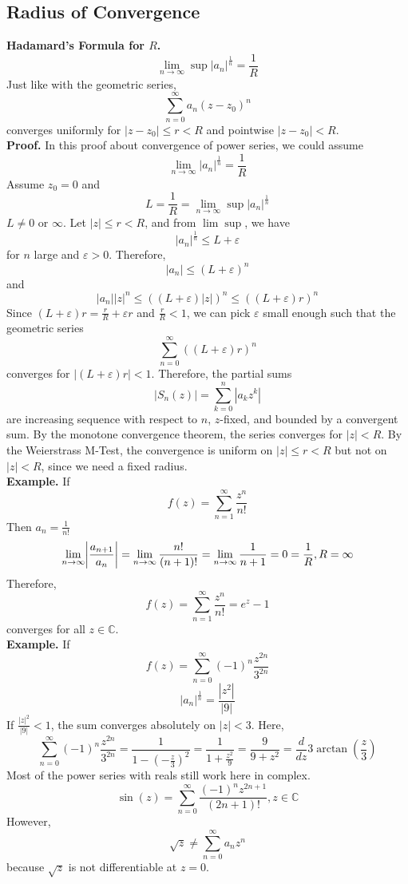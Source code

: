 \documentclass[11pt]{article}
\DeclarePairedDelimiter\abs{\lvert}{\rvert}
\begin{document}
\subsection{Radius of Convergence}
\textbf{Hadamard's Formula for $R$.} 
$$\lim_{n\to \infty} \sup|a_n|^{\frac{1}{n}} = \frac{1}{R}$$
Just like with the geometric series, 
$$ \sum_{n = 0}^{\infty} a_n(z - z_0)^n $$
converges uniformly for $|z - z_0| \leqslant r < R$ and pointwise $|z - z_0| < R$. \\
\textbf{Proof.} In this proof about convergence of power series, we could assume 
$$\lim_{n \to \infty} |a_n|^{\frac{1}{n}} = \frac{1}{R}$$
Assume $z_0 = 0$ and 
$$ L = \frac{1}{R} = \lim_{n \to \infty} \sup |a_n|^{\frac{1}{n}}$$
$L \neq 0$ or $\infty$. Let $|z| \leqslant r < R$, and from $\lim \sup$, we have 
$$|a_n|^{\frac{1}{n}} \leqslant L + \varepsilon $$
for $n$ large and $\varepsilon > 0$. 
Therefore, 
$$ |a_n| \leqslant (L + \varepsilon)^n $$
and 
$$ |a_n||z|^n \leqslant ((L + \varepsilon)|z|)^n \leqslant ((L + \varepsilon)r)^n $$
Since $(L + \varepsilon)r = \frac{r}{R} + \varepsilon r$ and $\frac{r}{R} < 1$, we can pick $\varepsilon$ small enough such that the geometric series 
$$ \sum_{n = 0}^{\infty} ((L + \varepsilon)r)^n$$
converges for $|(L + \varepsilon)r| < 1$. Therefore, the partial sums 
$$ |S_n(z)| = \sum_{k = 0}^n |a_kz^k|$$
are increasing sequence with respect to $n$, $z$-fixed, and bounded by a convergent sum. By the monotone convergence theorem, the series converges for $|z| < R$. By the Weierstrass M-Test, the convergence is uniform on $|z| \leqslant r < R$ but not on $|z| < R$, since we need a fixed radius. \\
\newline
\textbf{Example.} If 
$$f(z) = \sum_{n = 1}^{\infty} \frac{z^n}{n!} $$
Then $a_n = \frac{1}{n!}$
$$ \lim_{n \to \infty} \abs*{\frac{a_{n + 1}}{a_n}} = \lim_{n \to \infty} \frac{n!}{(n+1)!} = \lim_{n \to \infty} \frac{1}{n + 1} = 0 = \frac{1}{R}, R = \infty$$
Therefore, 
$$ f(z) = \sum_{n = 1}^{\infty} \frac{z^n}{n!} = e^z - 1$$
converges for all $z \in \mathbb{C}$. \\
\newpage
\textbf{Example.} If 
$$ f(z) = \sum_{n = 0}^{\infty} (-1)^n \frac{z^{2n}}{3^{2n}} $$
$$|a_n|^{\frac{1}{n}} = \frac{|z^2|}{|9|} $$
If $\frac{|z|^2}{|9|} < 1$, the sum converges absolutely on $|z| < 3$. Here, 
$$ \sum_{n = 0} ^ {\infty} (-1)^n \frac{z^{2n}}{3^{2n}} = \frac{1}{1 - (-\frac{z}{3})^2} = \frac{1}{1 + \frac{z^2}{9}} = \frac{9}{9 + z^2} = \frac{d}{dz}3\arctan(\frac{z}{3})$$
Most of the power series with reals still work here in complex. 
$$\sin(z) = \sum_{n = 0}^{\infty} \frac{(-1)^nz^{2n + 1}}{(2n + 1)!}, z \in \mathbb{C}$$
However, 
$$ \sqrt{z} \neq \sum_{n = 0}^{\infty} a_nz^n $$ 
because $\sqrt{z}$ is not differentiable at $z = 0$. \\ 
\newline
\end{document}
